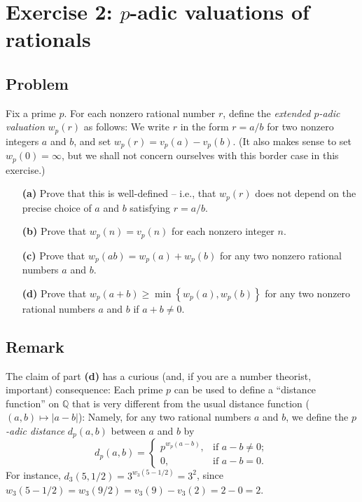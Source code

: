 \documentclass[paper=a4, fontsize=12pt]{scrartcl} %
\newcommand{\QQ}{\mathbb{Q}} %
\newcommand{\set}[1]{\left\{ #1 \right\}}
\newcommand{\abs}[1]{\left| #1 \right|}
\newcommand{\tup}[1]{\left( #1 \right)}
\theoremstyle{plainsl}
\theoremstyle{definition}
\theoremstyle{remark}
\begin{document}
\section{Exercise 2: $p$-adic valuations of rationals}

\subsection{Problem}

Fix a prime $p$.
For each nonzero rational number $r$, define the
\textit{extended $p$-adic valuation} $w_p\tup{r}$ as
follows:
We write $r$ in the form $r = a/b$
for two nonzero integers $a$ and $b$, and set
$w_p\tup{r} = v_p\tup{a} - v_p\tup{b}$.
(It also makes sense to set $w_p\tup{0} = \infty$,
but we shall not concern ourselves with this border case
in this exercise.)

\begin{enumerate}

\item[\textbf{(a)}]
Prove that this is well-defined -- i.e., that
$w_p\tup{r}$ does not depend on the precise choice of
$a$ and $b$ satisfying $r = a/b$.

\item[\textbf{(b)}]
Prove that $w_p\tup{n} = v_p\tup{n}$ for each nonzero
integer $n$.

\item[\textbf{(c)}]
Prove that $w_p\tup{ab} = w_p\tup{a} + w_p\tup{b}$ for
any two nonzero rational numbers $a$ and $b$.

\item[\textbf{(d)}]
Prove that $w_p\tup{a+b} \geq \min\set{w_p\tup{a}, w_p\tup{b}}$
for any two nonzero rational numbers $a$ and $b$
if $a+b \neq 0$.

\end{enumerate}

\subsection{Remark}

The claim of part \textbf{(d)} has a curious (and, if you are a
number theorist, important) consequence:
Each prime $p$ can be used to define a ``distance function'' on $\QQ$
that is very different from the usual distance function
($\tup{a,b} \mapsto \abs{a-b}$):
Namely, for any two rational numbers $a$ and $b$, we define
the \textit{$p$-adic distance} $d_p\tup{a, b}$ between $a$ and $b$ by
\[
d_p\tup{a, b}
= \begin{cases}
     p^{w_p\tup{a-b}}, & \text{if $a-b \neq 0$}; \\
     0,                & \text{if $a-b = 0$}.
  \end{cases}
\]
For instance, $d_3\tup{5, 1/2} = 3^{w_3\tup{5 - 1/2}} = 3^2$,
since $w_3\tup{5 - 1/2} = w_3\tup{9/2} = v_3\tup{9} - v_3\tup{2}
= 2 - 0 = 2$.
\end{document}
